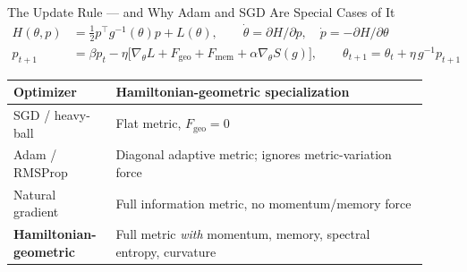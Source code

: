 \documentclass[aspectratio=169,11pt]{beamer}
\begin{document}
\begin{frame}{The Update Rule --- and Why Adam and SGD Are Special Cases of It}
  \small
  \begin{align*}
    H(\theta,p) &= \tfrac{1}{2}p^{\top}g^{-1}(\theta)p + L(\theta),
    \qquad \dot\theta = \partial H/\partial p, \quad \dot p = -\partial H/\partial \theta \\
    p_{t+1} &= \beta p_t - \eta\big[\nabla_\theta L + F_{\mathrm{geo}} + F_{\mathrm{mem}} + \alpha\nabla_\theta S(g)\big],
    \qquad \theta_{t+1} = \theta_t + \eta\, g^{-1} p_{t+1}
  \end{align*}
  \vspace{-0.3em}
  \scriptsize
  \begin{tabular}{@{}p{0.22\linewidth}p{0.7\linewidth}@{}}
    \toprule
    Optimizer & Hamiltonian-geometric specialization \\
    \midrule
    SGD / heavy-ball & Flat metric, $F_{\mathrm{geo}}=0$ \\
    Adam / RMSProp & Diagonal adaptive metric; ignores metric-variation force \\
    Natural gradient & Full information metric, no momentum/memory force \\
    \textbf{Hamiltonian-geometric} & Full metric \emph{with} momentum, memory, spectral entropy, curvature \\
    \bottomrule
  \end{tabular}
\end{frame}
\end{document}
